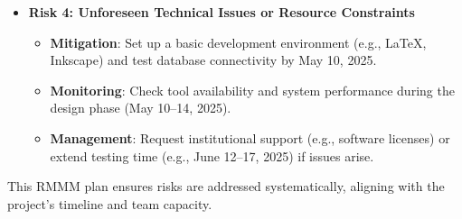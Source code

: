 \documentclass[a4paper,12pt]{article}
\begin{document}
\begin{itemize}
    \item \textbf{Risk 4: Unforeseen Technical Issues or Resource Constraints}
    \begin{itemize}
        \item \textbf{Mitigation}: Set up a basic development environment (e.g., LaTeX, Inkscape) and test database connectivity by May 10, 2025.
        \item \textbf{Monitoring}: Check tool availability and system performance during the design phase (May 10–14, 2025).
        \item \textbf{Management}: Request institutional support (e.g., software licenses) or extend testing time (e.g., June 12–17, 2025) if issues arise.
    \end{itemize}
\end{itemize}

This RMMM plan ensures risks are addressed systematically, aligning with the project's timeline and team capacity.
\end{document}
